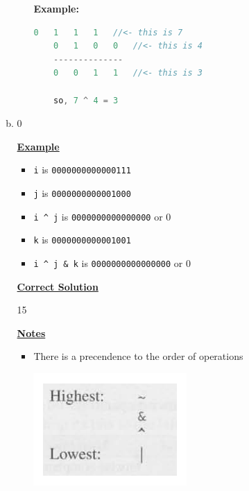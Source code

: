 \documentclass[12pt]{article}
\begin{document}
\begin{enumerate}[1.]
\begin{enumerate}[a)]
\begin{itemize}
            \textbf{Example:}

            \bigskip

    \begin{lstlisting}[language=c]
    0   1   1   1   //<- this is 7
    0   1   0   0   //<- this is 4
    --------------
    0   0   1   1   //<- this is 3

    so, 7 ^ 4 = 3
    \end{lstlisting}
        \end{itemize}

        \item 0

        \bigskip

        \underline{\textbf{Example}}

        \begin{itemize}
            \item \texttt{i} is \texttt{0000000000000111}
            \item \texttt{j} is \texttt{0000000000001000}
            \item \texttt{i \^{} j} is \texttt{0000000000000000} or 0
            \item \texttt{k} is \texttt{0000000000001001}
            \item \texttt{i \^{} j \& k} is \texttt{0000000000000000} or 0
        \end{itemize}

        \bigskip

        \begin{mdframed}
        \underline{\textbf{Correct Solution}}

        \bigskip

        \color{red}15\color{black}
        \end{mdframed}

        \bigskip

        \underline{\textbf{Notes}}

        \begin{itemize}
            \item There is a precendence to the order of operations

            \begin{center}
            \includegraphics[width=0.4\linewidth]{images/review_9_solution_2.png}
            \end{center}
        \end{itemize}
    \end{enumerate}


\end{enumerate}
\end{document}
